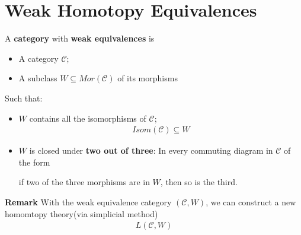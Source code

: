 \documentclass[Total.tex]{subfiles}
\begin{document}
		\section{Weak Homotopy Equivalences}
			\begin{Def}
				A \textbf{category} with \textbf{weak equivalences} is
				\begin{itemize}
					\item A category $\mathcal{C}$;
					\item A subclass $W\subseteq Mor(\mathcal{C})$ of its morphisms
				\end{itemize}
				Such that:
				\begin{itemize}
					\item $W$ contains all the isomorphisms of $\mathcal{C}$;
					\begin{gather*}
						Isom(\mathcal{C})\subseteq W
					\end{gather*}
					\item $W$ is closed under \textbf{two out of three}: In every commuting diagram in $\mathcal{C}$ of the form
					\begin{center}
					\end{center}
					if two of the three morphisms are in $W$, then so is the third.
				\end{itemize}
			\end{Def}
			
			\textbf{Remark} With the weak equivalence category $(\mathcal{C},W)$, we can construct a new homomtopy theory(via simplicial method)
			\begin{gather*}
				L(\mathcal{C},W)
			\end{gather*}
\end{document}
